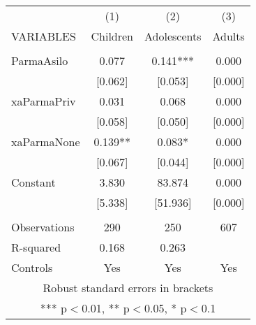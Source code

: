\begin{tabular}{lccc} \hline
 & (1) & (2) & (3) \\
VARIABLES & Children & Adolescents & Adults \\ \hline
 &  &  &  \\
ParmaAsilo & 0.077 & 0.141*** & 0.000 \\
 & [0.062] & [0.053] & [0.000] \\
xaParmaPriv & 0.031 & 0.068 & 0.000 \\
 & [0.058] & [0.050] & [0.000] \\
xaParmaNone & 0.139** & 0.083* & 0.000 \\
 & [0.067] & [0.044] & [0.000] \\
Constant & 3.830 & 83.874 & 0.000 \\
 & [5.338] & [51.936] & [0.000] \\
 &  &  &  \\
Observations & 290 & 250 & 607 \\
R-squared & 0.168 & 0.263 &  \\
 Controls & Yes & Yes & Yes \\ \hline
\multicolumn{4}{c}{ Robust standard errors in brackets} \\
\multicolumn{4}{c}{ *** p$<$0.01, ** p$<$0.05, * p$<$0.1} \\
\end{tabular}
